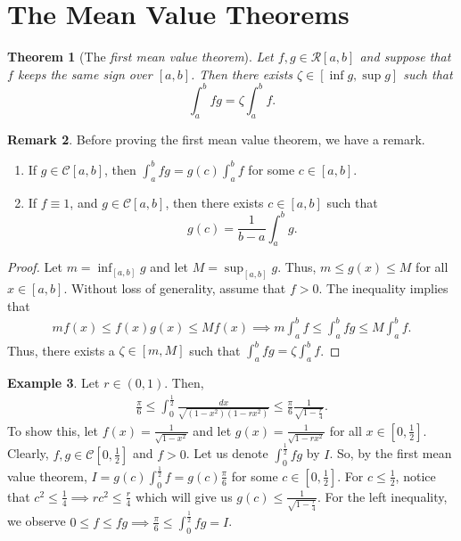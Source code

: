 \documentclass[15pt,a4paper]{book}
\newtheorem{theorem}{Theorem}[chapter]
\theoremstyle{definition}
\newtheorem{example}[theorem]{Example}
\newtheorem{remark}[theorem]{Remark}
\newcommand{\eax}[1]{\emph{#1}\index{#1}} %
\newcommand{\cR}{\mathcal{R}}
\newcommand{\cC}{\mathcal{C}}
\begin{document}
\section{The Mean Value Theorems}
\begin{theorem}[The \eax{first mean value theorem}]
    Let $f,g \in \cR[a,b]$ and suppose that $f$ keeps the same sign over $[a,b]$. Then there exists $\zeta \in [\inf g, \sup g]$ such that
    \begin{equation*}
        \int_{a}^{b} fg = \zeta \int_{a}^{b} f.
    \end{equation*}
\end{theorem}
\begin{remark} Before proving the first mean value theorem, we have a remark.
    \begin{enumerate}
        \item If $g \in \cC[a,b]$, then $\int_{a}^{b} fg = g(c) \int_{a}^{b} f$ for some $c \in [a,b]$.
        \item If $f \equiv 1$, and $g \in \cC[a,b]$, then there exists $c \in [a,b]$ such that
        \begin{equation*}
            g(c) = \frac{1}{b-a} \int_{a}^{b} g.
        \end{equation*}
    \end{enumerate}
\end{remark}
\begin{proof}
    Let $m = \inf_{[a,b]} g$ and let $M = \sup_{[a,b]} g$. Thus, $m \leq g(x) \leq M$ for all $x \in [a,b]$. Without loss of generality, assume that $f > 0$. The inequality implies that
    \begin{align}
        mf(x) \leq f(x) g(x) \leq M f(x) \implies m\int_{a}^{b} f \leq \int_{a}^{b} fg \leq M \int_{a}^{b} f.
    \end{align}
    Thus, there exists a $\zeta \in [m,M]$ such that $\int_{a}^{b} fg = \zeta \int_{a}^{b} f$.
\end{proof}

\begin{example}
    Let $r \in (0,1)$. Then,
    \begin{align}
        \frac{\pi}{6} \leq \int_{0}^{\frac{1}{2}} \frac{dx}{\sqrt{(1-x^{2})(1-rx^{2})}} \leq \frac{\pi}{6} \frac{1}{\sqrt{1-\frac{r}{4}}}.
    \end{align}
    To show this, let $f(x) = \frac{1}{\sqrt{1-x^{2}}}$ and let $g(x) = \frac{1}{\sqrt{1-rx^{2}}}$ for all $x \in [0,\frac{1}{2}]$. Clearly, $f,g \in \cC[0,\frac{1}{2}]$ and $f > 0$. Let us denote $\int_{0}^{\frac{1}{2}} fg$ by $I$. So, by the first mean value theorem, $I = g(c) \int_{0}^{\frac{1}{2}} f = g(c) \frac{\pi}{6}$ for some $c \in [0,\frac{1}{2}]$. For $c \leq \frac{1}{2}$, notice that $c^{2} \leq \frac{1}{4} \implies rc^{2} \leq \frac{r}{4}$ which will give us $g(c) \leq \frac{1}{\sqrt{1-\frac{r}{4}}}$. For the left inequality, we observe $0 \leq f \leq fg \implies \frac{\pi}{6} \leq \int_{0}^{\frac{1}{2}} fg = I$.
\end{example}
\end{document}
